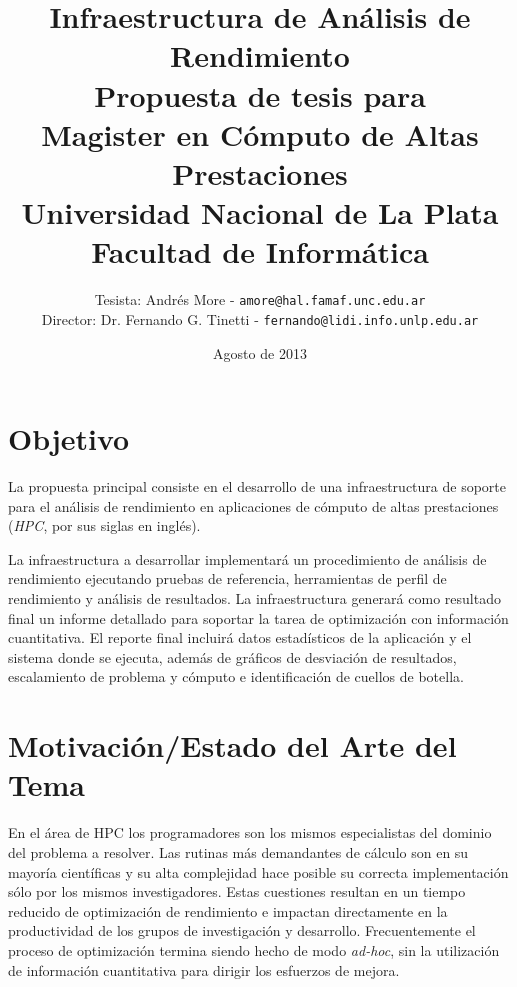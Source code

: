 \documentclass[a4paper]{article}
\begin{document}
\title{Infraestructura de Análisis de Rendimiento\\
\bigskip
{\large Propuesta de tesis para\\} Magister en Cómputo de Altas Prestaciones\\
\bigskip
Universidad Nacional de La Plata\\
Facultad de Informática\\
\bigskip
}

\author{Tesista: Andrés More - {\tt amore@hal.famaf.unc.edu.ar}\\
Director: Dr. Fernando G. Tinetti - {\tt fernando@lidi.info.unlp.edu.ar}}

\date{Agosto de 2013}

\maketitle

\newpage

\section{Objetivo}

La propuesta principal consiste en el desarrollo de una infraestructura de soporte para el análisis de rendimiento en aplicaciones de cómputo de altas prestaciones ({\it HPC}, por sus siglas en inglés).

\bigskip

La infraestructura a desarrollar implementará un procedimiento de análisis de rendimiento ejecutando pruebas de referencia, herramientas de perfil de rendimiento y análisis de resultados. La infraestructura generará como resultado final un informe detallado para soportar la tarea de optimización con información cuantitativa.
El reporte final incluirá datos estadísticos de la aplicación y el sistema donde se ejecuta, además de gráficos de desviación de resultados, escalamiento de problema y cómputo e identificación de cuellos de botella.

\section{Motivación/Estado del Arte del Tema}

En el área de HPC los programadores son los mismos especialistas del dominio del problema a resolver. Las rutinas
más demandantes de cálculo son en su mayoría científicas y su alta complejidad hace posible su correcta implementación sólo por los mismos investigadores. Estas cuestiones resultan en un tiempo reducido de optimización de rendimiento
e impactan directamente en la productividad de los grupos de investigación y desarrollo. Frecuentemente el proceso de optimización termina siendo hecho de modo {\it ad-hoc}, sin la utilización de información cuantitativa para dirigir los
esfuerzos de mejora.
\end{document}
